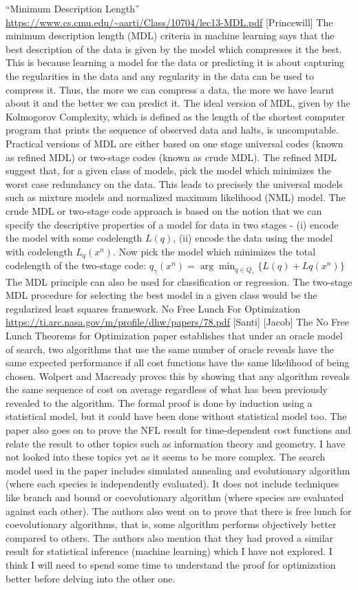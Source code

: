 \documentclass[12pt]{article}
\begin{document}
``Minimum Description Length” \url{https://www.cs.cmu.edu/~aarti/Class/10704/lec13-MDL.pdf} [Princewill]
The minimum description length (MDL) criteria in machine learning says that the best description of the data is given by the model which compresses it the best. This is because learning a model for the data or predicting it is about capturing the regularities in the data and any regularity in the data can be used to compress it. Thus, the more we can compress a data, the more we have learnt about it and the better we can predict it. The ideal version of MDL, given by the Kolmogorov Complexity, which is defined as the length of the shortest computer program that prints the sequence of observed data and halts, is uncomputable.
Practical versions of MDL are either based on one stage universal codes (known as refined MDL) or two-stage codes (known as crude MDL). The refined MDL suggest that, for a given class of models, pick the model which minimizes the worst case redundancy on the data. This leads to precisely the universal models such as mixture models and normalized maximum likelihood (NML) model. The crude MDL or two-stage code approach is based on the notion that we can specify the descriptive properties of a model for data in two stages - (i) encode the model with some codelength $L(q)$, (ii) encode the data using the model with codelength $L_q(x^n)$. Now pick the model which minimizes the total codelength of the two-stage code: $q_\gamma(x^n) = \arg \min_{q\in Q_\gamma} \{L(q) + Lq(x^n)\}$
The MDL principle can also be used for classification or regression. The two-stage MDL procedure for selecting the best model in a given class would be the regularized least squares framework.
No Free Lunch For Optimization
\url{https://ti.arc.nasa.gov/m/profile/dhw/papers/78.pdf} [Santi] [Jacob]	
The No Free Lunch Theorems for Optimization paper establishes that under an oracle model of search, two algorithms that use the same number of oracle reveals have the same expected performance if all cost functions have the same likelihood of being chosen. Wolpert and Macready proves this by showing that any algorithm reveals the same sequence of cost on average regardless of what has been previously revealed to the algorithm. The formal proof is done by induction using a statistical model, but it could have been done without statistical model too. The paper also goes on to prove the NFL result for time-dependent cost functions and relate the result to other topics such as information theory and geometry. I have not looked into these topics yet as it seems to be more complex.
The search model used in the paper includes simulated annealing and evolutionary algorithm (where each species is independently evaluated). It does not include techniques like branch and bound or coevolutionary algorithm (where species are evaluated against each other). The authors also went on to prove that there is free lunch for coevolutionary algorithms, that is, some algorithm performs objectively better compared to others.
The authors also mention that they had proved a similar result for statistical inference (machine learning) which I have not explored. I think I will need to spend some time to understand the proof for optimization better before delving into the other one.
\end{document}
